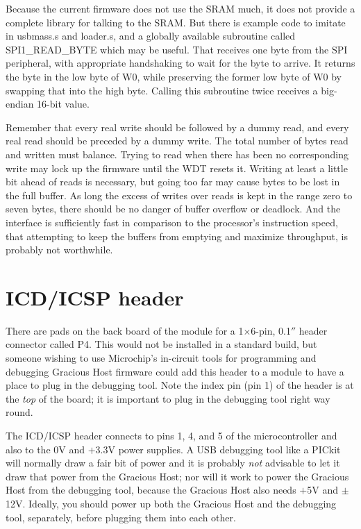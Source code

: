 Because the current firmware does not use the SRAM much, it does not provide
a complete library for talking to the SRAM.  But there is example code to
imitate in usbmass.s and loader.s, and a globally available subroutine
called SPI1\_READ\_BYTE which may be useful.  That receives one byte from the
SPI peripheral, with appropriate handshaking to wait for the byte to arrive. 
It returns the byte in the low byte of W0, while preserving the former low
byte of W0 by swapping that into the high byte.  Calling this subroutine
twice receives a big-endian 16-bit value.

Remember that every real write should be followed by a dummy read, and every
real read should be preceded by a dummy write.  The total number of bytes
read and written must balance.  Trying to read when there has been no
corresponding write may lock up the firmware until the WDT resets it. 
Writing at least a little bit ahead of reads is necessary, but going too far
may cause bytes to be lost in the full buffer.  As long the excess of writes
over reads is kept in the range zero to seven bytes, there should be no
danger of buffer overflow or deadlock.  And the interface is sufficiently
fast in comparison to the processor's instruction speed, that attempting to
keep the buffers from emptying and maximize throughput, is probably not
worthwhile.

\section{ICD/ICSP header}

There are pads on the back board of the module for a 1$\times$6-pin, 0.1$''$
header connector called P4.  This would not be installed in a standard
build, but someone wishing to use Microchip's in-circuit tools for
programming and debugging Gracious Host firmware could add this header to a
module to have a place to plug in the debugging tool.  Note the index pin
(pin 1) of the header is at the \emph{top} of the board; it is important to
plug in the debugging tool right way round.

The ICD/ICSP header connects to pins 1, 4, and 5 of the microcontroller and
also to the 0V and $+$3.3V power supplies.  A USB debugging tool like a
PICkit will normally draw a fair bit of power and it is probably \emph{not}
advisable to let it draw that power from the Gracious Host; nor will it work
to power the Gracious Host from the debugging tool, because the Gracious
Host also needs $+$5V and $\pm$12V.  Ideally, you should power up both the
Gracious Host and the debugging tool, separately, before plugging them into
each other.

